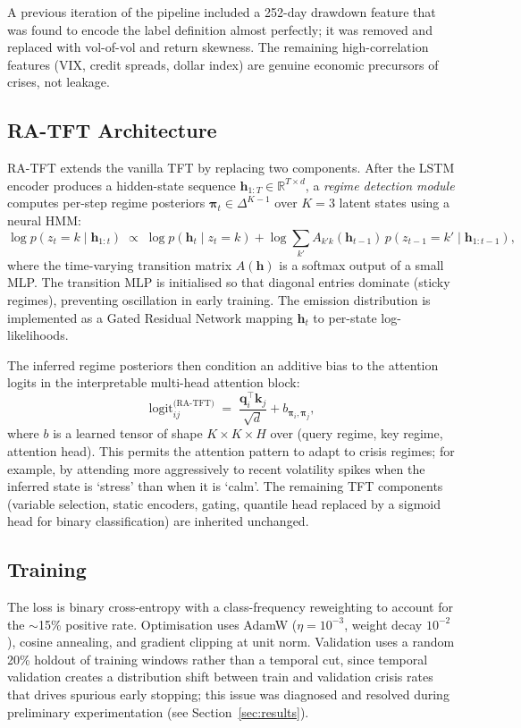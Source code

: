 \documentclass[11pt,a4paper]{article}
\begin{document}
A previous iteration of the pipeline included a 252-day drawdown feature
that was found to encode the label definition almost perfectly; it was
removed and replaced with vol-of-vol and return skewness. The remaining
high-correlation features (VIX, credit spreads, dollar index) are genuine
economic precursors of crises, not leakage.

\subsection{RA-TFT Architecture}
RA-TFT extends the vanilla TFT by replacing two components. After the LSTM
encoder produces a hidden-state sequence
$\mathbf{h}_{1:T}\in\mathbb{R}^{T\times d}$, a \emph{regime detection
module} computes per-step regime posteriors
$\boldsymbol{\pi}_t \in \Delta^{K-1}$ over $K=3$ latent states using a
neural HMM:
\begin{equation}
\log p(z_t = k \mid \mathbf{h}_{1:t}) \;\propto\; \log p(\mathbf{h}_t \mid z_t=k) + \log\!\!\sum_{k'} A_{k'k}(\mathbf{h}_{t-1}) \, p(z_{t-1}=k' \mid \mathbf{h}_{1:t-1}),
\end{equation}
where the time-varying transition matrix $A(\mathbf{h})$ is a softmax
output of a small MLP. The transition MLP is initialised so that diagonal
entries dominate (sticky regimes), preventing oscillation in early
training. The emission distribution is implemented as a Gated Residual
Network mapping $\mathbf{h}_t$ to per-state log-likelihoods.

The inferred regime posteriors then condition an additive bias to the
attention logits in the interpretable multi-head attention block:
\begin{equation}
\text{logit}^{\text{(RA-TFT)}}_{ij} \;=\; \frac{\mathbf{q}_i^\top \mathbf{k}_j}{\sqrt{d}} + b_{\boldsymbol{\pi}_i, \boldsymbol{\pi}_j},
\end{equation}
where $b$ is a learned tensor of shape $K\times K\times H$ over (query
regime, key regime, attention head). This permits the attention pattern to
adapt to crisis regimes; for example, by attending more aggressively to
recent volatility spikes when the inferred state is `stress' than when it
is `calm'. The remaining TFT components (variable selection, static
encoders, gating, quantile head replaced by a sigmoid head for binary
classification) are inherited unchanged.

\subsection{Training}
The loss is binary cross-entropy with a class-frequency reweighting to
account for the $\sim$15\% positive rate. Optimisation uses AdamW
($\eta=10^{-3}$, weight decay $10^{-2}$), cosine annealing, and gradient
clipping at unit norm. Validation uses a random 20\% holdout of training
windows rather than a temporal cut, since temporal validation creates a
distribution shift between train and validation crisis rates that drives
spurious early stopping; this issue was diagnosed and resolved during
preliminary experimentation (see Section~\ref{sec:results}).
\end{document}
